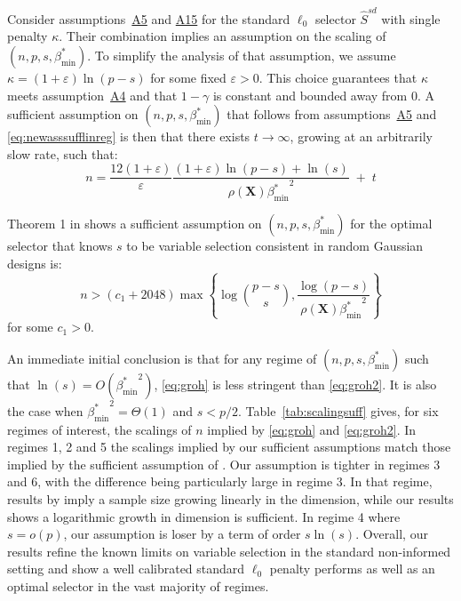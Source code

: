 \documentclass[
  12pt]{article}
\newcommand{\bX}{\mathbf{X}}
\begin{document}
Consider assumptions~\hyperlink{lab:A5}{A5} and \hyperlink{lab:A15}{A15} for the standard $\ell_0$ selector $\hat{S}^{sd}$ with single penalty $\kappa$. Their combination implies an assumption on the scaling of $(n,p,s,\beta_{\min}^*)$. To simplify the analysis of that assumption, we assume $\kappa=(1+\varepsilon)\ln(p-s)$ for some fixed $\varepsilon>0$. This choice guarantees that $\kappa$ meets assumption~\hyperlink{lab:A4}{A4} and that $1-\gamma$ is constant and bounded away from 0. A sufficient assumption on $(n,p,s,\beta_{\min}^*)$ that follows from assumptions~\hyperlink{lab:A5}{A5} and \eqref{eq:newasssufflinreg} is then that there exists $t\to \infty$, growing at an arbitrarily slow rate, such that:
\begin{equation}\label{eq:groh}
    n= \frac{12(1+\varepsilon)}{\varepsilon}\frac{(1+\varepsilon)\ln(p-s)+\ln(s)}{\rho(\bX){\beta_{\min}^*}^2} \;+\;t
\end{equation}

Theorem 1 in \cite{infotheowainwright} shows a sufficient assumption on $(n,p,s,\beta_{\min}^*)$ for the optimal selector that knows $s$ to be variable selection consistent in random Gaussian designs is:
\begin{equation}\label{eq:groh2}
    n > (c_1+2048) \max \left\{\log \binom{p-s}{s}, \frac{\log (p-s)}{\rho(\bX) {\beta_{\min}^*}^2}\right\}
\end{equation}
for some $c_1 >0$. 

An immediate initial conclusion is that for any regime of $(n,p,s,\beta_{\min}^*)$ such that $\ln(s)=O({\beta_{\min}^*}^2)$, \eqref{eq:groh} is less stringent than \eqref{eq:groh2}. It is also the case when ${\beta_{\min}^*}^2=\Theta(1)$ and $s<p/2$. Table~\ref{tab:scalingsuff} gives, for six regimes of interest, the scalings of $n$ implied by \eqref{eq:groh} and \eqref{eq:groh2}. In regimes 1, 2 and 5 the scalings implied by our sufficient assumptions match those implied by the sufficient assumption of \cite{infotheowainwright}. Our assumption is tighter in regimes 3 and 6, with the difference being particularly large in regime 3. In that regime, results by \cite{infotheowainwright} imply a sample size growing linearly in the dimension, while our results shows a logarithmic growth in dimension is sufficient. In regime 4 where $s=o(p)$, our assumption is loser by a term of order $s\ln(s)$. Overall, our results refine the known limits on variable selection in the standard non-informed setting and show a well calibrated standard $\ell_0$ penalty performs as well as an optimal selector in the vast majority of regimes.
\end{document}
